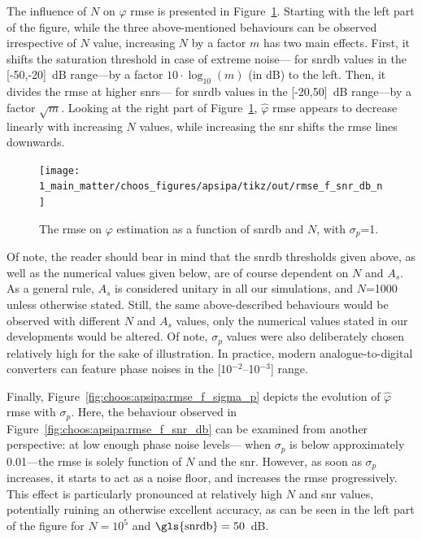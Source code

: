 The influence of $N$ on $\widehat{\varphi}$ \gls{rmse} is presented in Figure~\ref{fig:choos:apsipa:rmse_f_snr_db_n}. Starting with the left part of the figure, while the three above-mentioned behaviours can be observed irrespective of $N$ value, increasing $N$ by a factor $m$ has two main effects. First, it shifts the saturation threshold in case of extreme noise---\ie{} for \gls{snrdb} values in the [-50,-20]~dB range---by a factor $10\cdot \log_{10}(m)$ (in dB) to the left. Then, it divides the \gls{rmse} at higher \glspl{snr}---\ie{} for \gls{snrdb} values in the [-20,50]~dB range---by a factor $\sqrt{m}$. Looking at the right part of Figure~\ref{fig:choos:apsipa:rmse_f_snr_db_n}, $\widehat{\varphi}$ \gls{rmse} appears to decrease linearly with increasing $N$ values, while increasing the \gls{snr} shifts the \gls{rmse} lines downwards.

\begin{figure}
	\centering
	\texttt{[image: 1\_main\_matter/choos\_figures/apsipa/tikz/out/rmse\_f\_snr\_db\_n]}
	\caption[The \gls{rmse} on $\varphi$ estimation as a function of \gls{snrdb} and $N$.]{The \gls{rmse} on $\varphi$ estimation as a function of \gls{snrdb} and $N$, with $\sigma_p$=1{\degree}.}
	\label{fig:choos:apsipa:rmse_f_snr_db_n}
\end{figure}

Of note, the reader should bear in mind that the \gls{snrdb} thresholds given above, as well as the numerical values given below, are of course dependent on $N$ and $A_s$. As a general rule, $A_s$ is considered unitary in all our simulations, and $N$=1000 unless otherwise stated. Still, the same above-described behaviours would be observed with different $N$ and $A_s$ values, only the numerical values stated in our developments would be altered. Of note, $\sigma_p$ values were also deliberately chosen relatively high for the sake of illustration. In practice, modern analogue-to-digital converters can feature phase noises in the [10$^{-2}$--10$^{-3}$]{\degree} range\cite{ad_phase_noise, calosso2019}.

Finally, Figure~\ref{fig:choos:apsipa:rmse_f_sigma_p} depicts the evolution of $\widehat{\varphi}$ \gls{rmse} with $\sigma_p$. Here, the behaviour observed in Figure~\ref{fig:choos:apsipa:rmse_f_snr_db} can be examined from another perspective: at low enough phase noise levels---\ie{} when $\sigma_p$ is below approximately 0.01{\degree}---the \gls{rmse} is solely function of $N$ and the \gls{snr}. However, as soon as $\sigma_p$ increases, it starts to act as a noise floor, and increases the \gls{rmse} progressively. This effect is particularly pronounced at relatively high $N$ and \gls{snr} values, potentially ruining an otherwise excellent accuracy, as can be seen in the left part of the figure for $N=10^5$ and $\text{\gls{snrdb}}=50$~dB.

